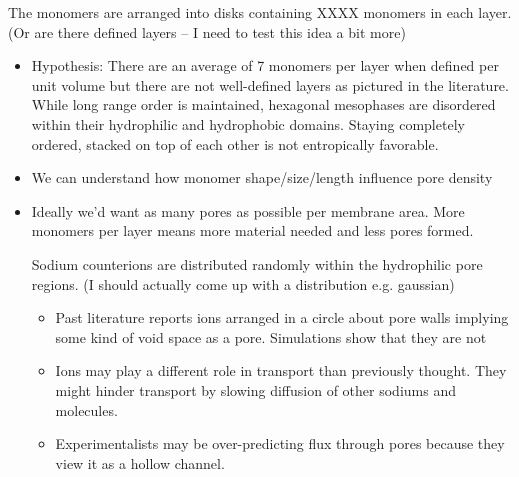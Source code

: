 \documentclass{article}
\begin{document}
	The monomers are arranged into disks containing XXXX monomers in each layer. (Or are there defined layers -- I need to test this idea a bit more) 
	\begin{itemize}
		\item Hypothesis: There are an average of 7 monomers per layer when defined per unit volume but there are not well-defined layers as pictured in the literature. While long range order is maintained, hexagonal mesophases are disordered within their hydrophilic and hydrophobic domains. Staying completely ordered, stacked on top of each other is not entropically favorable.
		\item We can understand how monomer shape/size/length influence pore density
		\item Ideally we'd want as many pores as possible per membrane area. More monomers per layer means more material needed and less pores formed. 
	
	Sodium counterions are distributed randomly within the hydrophilic pore regions. (I should actually come up with a distribution e.g. gaussian)
	\begin{itemize}
		\item Past literature reports ions arranged in a circle about pore walls implying some kind of void space as a pore. Simulations show that they are not
		\item Ions may play a different role in transport than previously thought. They might hinder transport by slowing diffusion of other sodiums and molecules.
		\item  Experimentalists may be over-predicting flux through pores because they view it as a hollow channel.
	

\end{itemize}
\end{itemize}
\end{document}
